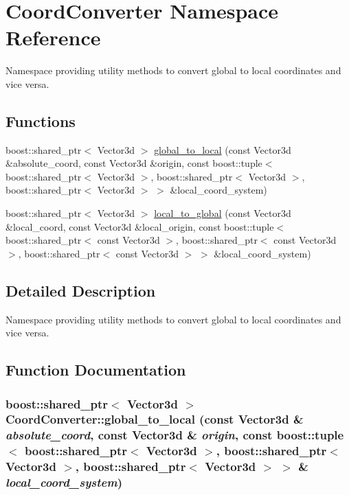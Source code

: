 \hypertarget{namespace_coord_converter}{
\section{CoordConverter Namespace Reference}
\label{namespace_coord_converter}
}
Namespace providing utility methods to convert global to local coordinates and vice versa.  


\subsection*{Functions}
\begin{CompactItemize}
\item 
boost::shared\_\-ptr$<$ Vector3d $>$ \hyperlink{namespace_coord_converter_7e349878b96f2912c0ca387ffe8cb86a}{global\_\-to\_\-local} (const Vector3d \&absolute\_\-coord, const Vector3d \&origin, const boost::tuple$<$ boost::shared\_\-ptr$<$ Vector3d $>$, boost::shared\_\-ptr$<$ Vector3d $>$, boost::shared\_\-ptr$<$ Vector3d $>$ $>$ \&local\_\-coord\_\-system)
\item 
boost::shared\_\-ptr$<$ Vector3d $>$ \hyperlink{namespace_coord_converter_4b23c9940a307b7cc9e3e9d843a48770}{local\_\-to\_\-global} (const Vector3d \&local\_\-coord, const Vector3d \&local\_\-origin, const boost::tuple$<$ boost::shared\_\-ptr$<$ const Vector3d $>$, boost::shared\_\-ptr$<$ const Vector3d $>$, boost::shared\_\-ptr$<$ const Vector3d $>$ $>$ \&local\_\-coord\_\-system)
\end{CompactItemize}


\subsection{Detailed Description}
Namespace providing utility methods to convert global to local coordinates and vice versa. 

\subsection{Function Documentation}
\hypertarget{namespace_coord_converter_7e349878b96f2912c0ca387ffe8cb86a}{
\subsubsection[global\_\-to\_\-local]{\setlength{\rightskip}{0pt plus 5cm}boost::shared\_\-ptr$<$ Vector3d $>$ CoordConverter::global\_\-to\_\-local (const Vector3d \& {\em absolute\_\-coord}, \/  const Vector3d \& {\em origin}, \/  const boost::tuple$<$ boost::shared\_\-ptr$<$ Vector3d $>$, boost::shared\_\-ptr$<$ Vector3d $>$, boost::shared\_\-ptr$<$ Vector3d $>$ $>$ \& {\em local\_\-coord\_\-system})}}
\label{namespace_coord_converter_7e349878b96f2912c0ca387ffe8cb86a}


